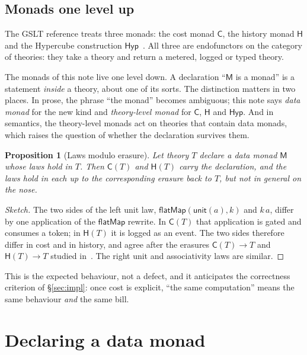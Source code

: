 \documentclass[11pt]{article}
\theoremstyle{branddef}
\theoremstyle{brandplain}
\newtheorem{proposition}[definition]{Proposition}
\theoremstyle{brandrem}
\newcommand{\M}{\mathsf{M}}
\newcommand{\unit}{\mathsf{unit}}
\newcommand{\bind}{\mathsf{flatMap}}
\newcommand{\cost}{\mathsf{C}}
\newcommand{\hist}{\mathsf{H}}
\newcommand{\hyp}{\mathsf{Hyp}}
\begin{document}
\subsection{Monads one level up}

The GSLT reference treats three monads: the cost monad \(\cost\), the history
monad \(\hist\) and the Hypercube construction \(\hyp\)~\cite{GSLTintro,
CostMonad, History, Hypercube}. All three are endofunctors on the category of
theories: they take a theory and return a metered, logged or typed theory.

The monads of this note live one level down. A declaration
``\(\M\) is a monad'' is a statement \emph{inside} a theory, about one of its
sorts. The distinction matters in two places. In prose, the phrase ``the
monad'' becomes ambiguous; this note says \emph{data monad} for the new kind and
\emph{theory-level monad} for \(\cost\), \(\hist\) and \(\hyp\). And in
semantics, the theory-level monads act on theories that contain data monads,
which raises the question of whether the declaration survives them.

\begin{proposition}[Laws modulo erasure]
\label{prop:modulo-erasure}
Let theory \(T\) declare a data monad \(\M\) whose laws hold in \(T\). Then
\(\cost(T)\) and \(\hist(T)\) carry the declaration, and the laws hold in each
up to the corresponding erasure back to \(T\), but not in general on the nose.
\end{proposition}

\begin{proof}[Sketch]
The two sides of the left unit law,
\(\bind(\unit(a), k)\) and \(k\,a\), differ by one application of the
\(\bind\) rewrite. In \(\cost(T)\) that application is gated and consumes a
token; in \(\hist(T)\) it is logged as an event. The two sides therefore differ
in cost and in history, and agree after the erasures \(\cost(T)\to T\) and
\(\hist(T)\to T\) studied in~\cite{TwoErasures}. The right unit and
associativity laws are similar.
\end{proof}

This is the expected behaviour, not a defect, and it anticipates the
correctness criterion of \S\ref{sec:impl}: once cost is explicit, ``the same
computation'' means the same behaviour \emph{and} the same bill.

\section{Declaring a data monad}
\label{sec:ddl}
\end{document}
